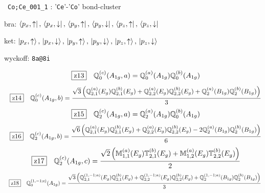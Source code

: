 \documentclass[fleqn,10pt,landscape]{jsarticle}
\begin{document}
\noindent\textbullet\, \texttt{Co;Ce_001_1} : '\texttt{Ce}'-'\texttt{Co}' bond-cluster

\noindent\quad * bra: $\bra{p_{x},\uparrow},\, \bra{p_{x},\downarrow},\, \bra{p_{y},\uparrow},\, \bra{p_{y},\downarrow},\, \bra{p_{z},\uparrow},\, \bra{p_{z},\downarrow}$

\noindent\quad * ket: $\ket{p_{x},\uparrow},\, \ket{p_{x},\downarrow},\, \ket{p_{y},\uparrow},\, \ket{p_{y},\downarrow},\, \ket{p_{z},\uparrow},\, \ket{p_{z},\downarrow}$

\noindent\quad * wyckoff: \texttt{8a@8i}

\begin{dmath*}
\hspace*{3mm}\fbox{z13}\quad \mathbb{Q}_{0}^{(c)}(A_{1g},a)=\mathbb{Q}_{0}^{(a)}(A_{1g}) \mathbb{Q}_{0}^{(b)}(A_{1g})
\end{dmath*}
\begin{dmath*}
\hspace*{3mm}\fbox{z14}\quad \mathbb{Q}_{0}^{(c)}(A_{1g},b)=\frac{\sqrt{3} \left(\mathbb{Q}_{2,1}^{(a)}(E_{g}) \mathbb{Q}_{2,1}^{(b)}(E_{g}) + \mathbb{Q}_{2,2}^{(a)}(E_{g}) \mathbb{Q}_{2,2}^{(b)}(E_{g}) + \mathbb{Q}_{2}^{(a)}(B_{1g}) \mathbb{Q}_{2}^{(b)}(B_{1g})\right)}{3}
\end{dmath*}
\begin{dmath*}
\hspace*{3mm}\fbox{z15}\quad \mathbb{Q}_{2}^{(c)}(A_{1g},a)=\mathbb{Q}_{2}^{(a)}(A_{1g}) \mathbb{Q}_{0}^{(b)}(A_{1g})
\end{dmath*}
\begin{dmath*}
\hspace*{3mm}\fbox{z16}\quad \mathbb{Q}_{2}^{(c)}(A_{1g},b)=\frac{\sqrt{6} \left(\mathbb{Q}_{2,1}^{(a)}(E_{g}) \mathbb{Q}_{2,1}^{(b)}(E_{g}) + \mathbb{Q}_{2,2}^{(a)}(E_{g}) \mathbb{Q}_{2,2}^{(b)}(E_{g}) - 2 \mathbb{Q}_{2}^{(a)}(B_{1g}) \mathbb{Q}_{2}^{(b)}(B_{1g})\right)}{6}
\end{dmath*}
\begin{dmath*}
\hspace*{3mm}\fbox{z17}\quad \mathbb{Q}_{2}^{(c)}(A_{1g},c)=\frac{\sqrt{2} \left(\mathbb{M}_{1,1}^{(a)}(E_{g}) \mathbb{T}_{2,1}^{(b)}(E_{g}) + \mathbb{M}_{1,2}^{(a)}(E_{g}) \mathbb{T}_{2,2}^{(b)}(E_{g})\right)}{2}
\end{dmath*}
\begin{dmath*}
\hspace*{3mm}\fbox{z18}\quad \mathbb{Q}_{0}^{(1,-1;c)}(A_{1g})=\frac{\sqrt{3} \left(\mathbb{Q}_{2,1}^{(1,-1;a)}(E_{g}) \mathbb{Q}_{2,1}^{(b)}(E_{g}) + \mathbb{Q}_{2,2}^{(1,-1;a)}(E_{g}) \mathbb{Q}_{2,2}^{(b)}(E_{g}) + \mathbb{Q}_{2}^{(1,-1;a)}(B_{1g}) \mathbb{Q}_{2}^{(b)}(B_{1g})\right)}{3}
\end{dmath*}
\end{document}
